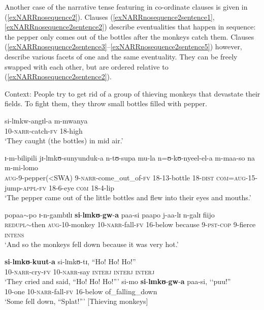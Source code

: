 Another case of the narrative tense featuring in co-ordinate clauses is given in
(\ref{exNARRnosequence2}). Clauses (\ref{exNARRnosequence2sentence1}, \ref{exNARRnosequence2sentence2}) describe eventualities that happen in sequence: the pepper only comes out of the bottles after the monkeys catch them. Clauses (\ref{exNARRnosequence2sentence3}--\ref{exNARRnosequence2sentence5}) however, describe various facets of one and the same eventuality. They can be freely swapped with each other, but are ordered relative to (\ref{exNARRnosequence2sentence2}).

\begin{exe}
\ex \label{exNARRnosequence2}
Context: People try to get rid of a group of thieving monkeys that devastate their fields. To fight them, they throw small bottles filled with pepper.
\begin{xlist}
\ex \label{exNARRnosequence2sentence1} \gll si-lɪnkw-angɪl-a m-mwanya\\
10-\textsc{narr}-catch-\textsc{fv} 18-high\\
\glt `They caught (the bottles) in mid air.'

\ex \label{exNARRnosequence2sentence2} \gll ɪ-m-bilipili jɪ-lɪnkʊ-sunyunduk-a n-tʊ-supa mu-la n=ʊ-kʊ-nyeel-el-a m-maa-so na m-mi-lomo \\
\textsc{aug}-9-pepper(<SWA) 9-\textsc{narr}-come\_out\_of-\textsc{fv} 18-13-bottle 18-\textsc{dist} \textsc{com}=\textsc{aug}-15-jump-\textsc{appl}-\textsc{fv} 18-6-eye \textsc{com} 18-4-lip\\
\glt `The pepper came out of the little bottles and flew into their eyes and mouths.'

\ex \label{exNARRnosequence2sentence3} \gll popaa$\sim$po ɪ-n-gambɪlɪ \textbf{si}-\textbf{lɪnkʊ}-\textbf{gw}-\textbf{a} paa-si paapo j-aa-lɪ n-galɪ fiijo\\
\textsc{redupl}$\sim$then \textsc{aug}-10-monkey 10-\textsc{narr}-fall-\textsc{fv} 16-below because 9-\textsc{pst}-\textsc{cop} 9-fierce \textsc{intens}\\
\glt `And so the monkeys fell down because it was very hot.'

\ex \label{exNARRnosequence2sentence4} \gll \textbf{si}-\textbf{lɪnkʊ}-\textbf{kuut}-\textbf{a} si-lɪnkʊ-tɪ, ``Ho! Ho! Ho!''\\
10-\textsc{narr}-cry-\textsc{fv} 10-\textsc{narr}-say \phantom{\lq\lq}\textsc{interj} \textsc{interj} \textsc{interj}\\
\glt `‎‎They cried and said, ``Ho! Ho! Ho!''{}'
\ex \label{exNARRnosequence2sentence5} \gll si-mo \textbf{si}-\textbf{lɪnkʊ}-\textbf{gw}-\textbf{a} paa-si, \textup{\lq\lq}puu!\textup{''}\\
10-one 10-\textsc{narr}-fall-\textsc{fv} 16-below \phantom{\lq\lq}of\_falling\_down\\
\glt `Some fell down, ``Splat!''{}' [Thieving monkeys]
\end{xlist}
\end{exe} %

